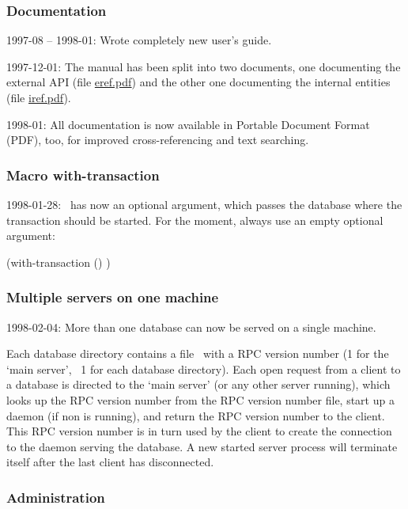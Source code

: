 \subsubsection{Documentation}

1997-08 -- 1998-01: Wrote completely new user's guide.

1997-12-01: The manual has been split into two documents, one
documenting the external API (file \url{eref.pdf}) and the other one
documenting the internal entities (file \url{iref.pdf}).

1998-01: All documentation is now available in Portable Document
Format (PDF), too, for improved cross-referencing and text searching.

\subsubsection{Macro with-transaction}

1998-01-28: \ has now an optional argument,
which passes the database where the transaction should be started. For
the moment, always use an empty optional argument:
\begin{IndentedCompactCode}
(with-transaction ()
  )
\end{IndentedCompactCode}

\subsubsection{Multiple servers on one machine}

1998-02-04: More than one database can now be served on a single
machine.

Each database directory contains a file \ with a RPC
version number (1 for the `main server', \gt\ 1 for each database
directory). Each open request from a client to a database is directed
to the `main server' (or any other server running), which looks up the
RPC version number from the RPC version number file, start up a daemon
(if non is running), and return the RPC version number to the client.
This RPC version number is in turn used by the client to create the
connection to the daemon serving the database.  A new started server
process will terminate itself after the last client has disconnected.

\subsubsection{Administration}

